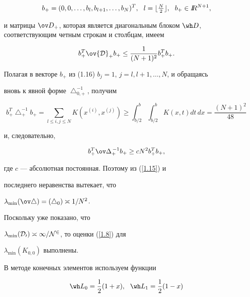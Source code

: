 \begin{pf}
\begin{equation}


b_+=(0,0,\dotsc,b_l,b_{l+1},\dotsc,b_N)^T,\ \


l=\lfloor\tfrac{N}{2}\rfloor,\ \ b_+\in\RR^{N+1},


\end{equation}


и матрицы $\ov D_+$, которая является диагональным блоком $\wh


D$, соответствующим четным строкам и столбцам, имеем


\begin{equation}


b^T_+\ov{\cal D}_+b_+\le\frac{1}{(N+1)^2} b_+^T b_+.


\end{equation}


Полагая в векторе $b_+$ из (1.16) $b_j=1$, $j=l,l+1,\dotsc,N$, и обращаясь


вновь к явной форме $\bigtriangleup^{-1}_{0,+}$, получим


$$


b^T_+\bigtriangleup^{-1}_+b_+=\sum_{l\le i, j\le N}


K(x^{(i)},x^{(j)})\ge\int^b_{b/2}\int


^b_{b/2}K(x,t)dt\,dx=\frac{(N+1)^2}{48}


$$


и, следовательно,


$$


b_+^T\ov\Delta^{\,-1}_+b_+\ge cN^2 b_+^T b_+,


$$


где $c$ --- абсолютная постоянная. Поэтому из (\ref{1.15}) и


последнего неравенства вытекает, что


$\lambda_{\min}(\ov\bigtriangleup)=


(\bigtriangleup_0)\asymp 1/N^2$.


Поскольку уже показано, что


$\lambda_{\min}(\cal D_0)\asymp 1/N^2$, то оценки (\ref{1.8}) для


$\lambda_{\min}(K_{0,0})$ выполнены.


\end{pf}





В методе конечных элементов используем функции


\begin{equation}


\wh L_0=\frac{1}{2}(1+x),\ \ \wh L_1=\frac{1}{2}(1-x)


\label{1.16}


\end{equation}


